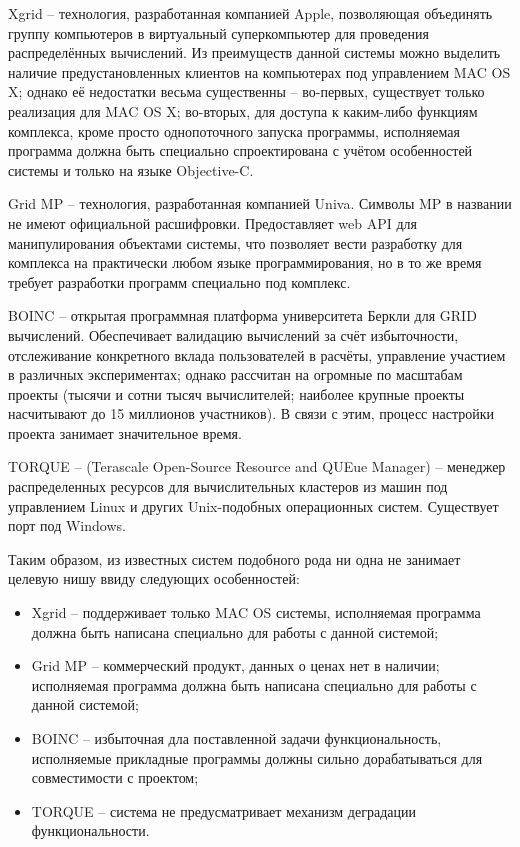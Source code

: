 \documentclass[a4paper,12pt]{report}
\numberwithin{equation}{section}
\begin{document}
Xgrid -- технология, разработанная компанией Apple, позволяющая объединять группу компьютеров в виртуальный суперкомпьютер для проведения распределённых вычислений. 
Из преимуществ данной системы можно выделить наличие предустановленных клиентов на компьютерах под управлением MAC OS X; однако её недостатки весьма существенны -- во-первых, существует только реализация для MAC OS X; во-вторых, для доступа к каким-либо функциям комплекса, кроме просто однопоточного запуска программы, исполняемая программа должна быть специально спроектирована с учётом особенностей системы и только на языке Objective-C.

Grid MP -- технология, разработанная компанией Univa. Символы MP в названии не имеют официальной расшифровки. 
Предоставляет web API для манипулирования объектами системы, что позволяет вести разработку для комплекса на практически любом языке программирования, но в то же время требует разработки программ специально под комплекс.

BOINC -- открытая программная платформа университета Беркли для GRID вычислений. 
Обеспечивает валидацию вычислений за счёт избыточности, отслеживание конкретного вклада пользователей в расчёты, управление участием в различных экспериментах; однако рассчитан на огромные по масштабам проекты (тысячи и сотни тысяч вычислителей; наиболее крупные проекты насчитывают до 15 миллионов участников). 
В связи с этим, процесс настройки проекта занимает значительное время.

TORQUE -- (Terascale Open-Source Resource and QUEue Manager) -- менеджер распределенных ресурсов для вычислительных кластеров из машин под управлением Linux и других Unix-подобных операционных систем. Существует порт под Windows.

Таким образом, из известных систем подобного рода ни одна не занимает целевую нишу ввиду следующих особенностей: 
\begin{itemize}
  \item Xgrid -- поддерживает только MAC OS системы, исполняемая программа должна быть написана специально для работы с данной системой;
  \item Grid MP -- коммерческий продукт, данных о ценах нет в наличии; исполняемая программа должна быть написана специально для работы с данной системой;
  \item BOINC -- избыточная дла поставленной задачи функциональность, исполняемые прикладные программы должны сильно дорабатываться для совместимости с проектом;
  \item TORQUE -- система не предусматривает механизм деградации функциональности.
\end{itemize}
\end{document}
